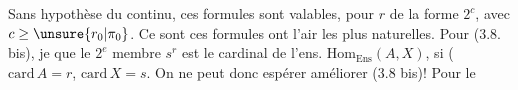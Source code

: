 Sans hypothèse du continu, ces formules sont  valables, pour $r$ de la forme $2^c$, avec $c\ge\unsure{r_0|\pi_0}$.
Ce sont ces  formules  ont l'air les plus naturelles. Pour (3.8. bis),  je  que le $2^e$ membre $s^r$ est le cardinal de l'ens. $\mathrm{Hom}_{\mathrm{Ens}}(A,X)$, si   ($\mathrm{card}\,A=r$, $\mathrm{card}\,X=s$. On ne peut donc espérer améliorer (3.8 bis)! Pour le
